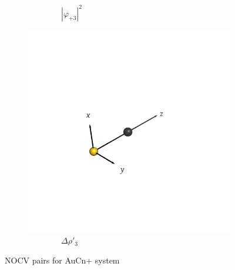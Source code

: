 \documentclass[journal=inoraj,manuscript=article]{achemso}
\begin{document}
\begin{figure}[!h]
\begin{subfigure}[t]{0.32\textwidth}
        \caption*{\ \ \ \ \ \ \ \ $|\varphi_{+3}|^2$} 
    \end{subfigure}
    \hfill
    \begin{subfigure}[t]{0.32\textwidth}
        \centering
        \includegraphics[width=\linewidth]{./AuCn+/pair5.png} 
        \caption*{\ \ \ \ \ \ \ \ $\Delta \rho'_3$} 
    \end{subfigure}

\caption{NOCV pairs for AuCn+ system}
\end{figure}
\end{document}
